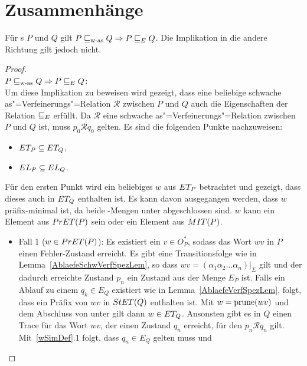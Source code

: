 \section{Zusammenhänge}

\begin{Satz}
  \label{ZusammenhFehlerSatz}
  Für \MEIO{}s $P$ und $Q$ gilt $P\sqsubseteq _{\mathrm{w}\text{-}\mathrm{as}} Q\Rightarrow P \sqsubseteq  _E Q$. Die
  Implikation in die andere Richtung gilt jedoch nicht.
\end{Satz}
\begin{proof}\mbox{}\\
  $P\sqsubseteq _{\mathrm{w}\text{-}\mathrm{as}} Q\Rightarrow P \sqsubseteq  _E Q$:\\
  Um diese Implikation zu beweisen wird gezeigt, dass eine beliebige
  schwache as"=Verfeinerungs"=Relation $\mathcal{R}$ zwischen $P$ und $Q$ auch
  die Eigenschaften der Relation $ \sqsubseteq  _E$ erfüllt. Da $\mathcal{R}$ eine
  schwache as"=Verfeinerungs"=Relation zwischen $P$ und $Q$ ist, muss $p_0
  \mathcal{R} q_0$ gelten. Es sind die folgenden Punkte nachzuweisen:
  \begin{itemize}
    \item $ET _P \subseteq ET _Q$,
    \item $EL _P \subseteq EL _Q$.
  \end{itemize}
  Für den ersten Punkt wird ein beliebiges $w$ aus $ET _P$ betrachtet und
  gezeigt, dass dieses auch in $ET _Q$ enthalten ist. Es kann davon
  ausgegangen werden, dass $w$ präfix-minimal ist, da beide \ET{}-Mengen unter
  \cont{} abgeschlossen sind. $w$ kann ein Element aus $PrET (P)$ sein oder
  ein Element aus $MIT (P)$.
  \begin{itemize}
    \item Fall 1 ($w\in PrET (P)$): Es existiert ein $v\in O_P^*$, sodass das
      Wort $wv$ in $P$ einen Fehler-Zustand erreicht. Es gibt eine
      Transitionsfolge wie in Lemma~\ref{AblaefeSchwVerfSpezLem}, so dass $wv =
      (\alpha _1\alpha _2\dots \alpha _n)|_{\Sigma}$ gilt und der dadurch
      erreichte Zustand $p_n$ ein Zustand aus der Menge $E_P$ ist. Falls ein
      Ablauf zu einem $q_k\in E_Q$ existiert wie in
      Lemma~\ref{AblaefeVerfSpezLem}, folgt, dass ein Präfix von $wv$ in $StET
      (Q)$ enthalten ist. Mit $w=\mathrm{prune} (wv)$ und dem Abschluss von \ET{} unter
      \cont{} gilt dann $w\in ET _Q$. Ansonsten gibt es in $Q$ einen Trace für
      das Wort $wv$, der einen Zustand $q_n$ erreicht, für den $p_n \mathcal{R}
      q_n$ gilt. Mit~\ref{wSimDef}.1 folgt, dass $q_n\in E_Q$ gelten muss und

\end{itemize}
\end{proof}

